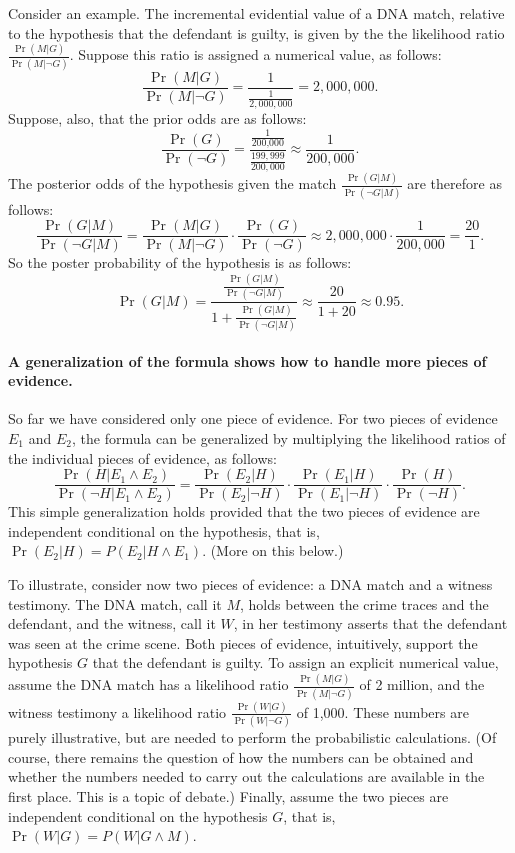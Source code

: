 \documentclass[10pt]{article}
\begin{document}
Consider an example. The incremental evidential value of a DNA match, relative to the hypothesis 
that the defendant is guilty, is given by the the likelihood ratio $\frac{\Pr(M |G)}{\Pr( M | \neg G)}$. 
Suppose this ratio is assigned a numerical value, as follows:
%
\[\frac{\Pr(M |G)}{\Pr( M | \neg G)}=\frac{1}{\frac{1}{2,000,000}}=2, 000,000.\]
% 
Suppose, also, that the prior odds are as follows:
%
\[\frac{\Pr(G)}{\Pr(\neg G)}=\frac{\frac{1}{\text{200,000}}}{\frac{199,999}{200,000}}\approx \frac{1}{200,000}.\]
% 
The posterior odds of the hypothesis given the match $\frac{\Pr(G|M)}{\Pr(\neg G|M)}$ are therefore as follows:
%
\[\frac{\Pr(G|M)}{\Pr(\neg G|M)}= \frac{\Pr(M |G)}{\Pr( M | \neg G)}\cdot \frac{\Pr(G)}{\Pr(\neg G)} \approx 2,000,000 \cdot \frac{1}{200,000}=\frac{20}{1}.\]
% 
So the poster probability of the hypothesis is as follows:
%
\[\Pr(G|M)= \frac{\frac{\Pr(G|M)}{\Pr(\neg G|M)}}{1+ \frac{\Pr(G|M)}{\Pr(\neg G|M)}} \approx \frac{20}{1+20}\approx 0.95.\]
%
 


\paragraph{A generalization of the formula shows how to handle more pieces of evidence.} 
So far we have considered only one piece of evidence. 
For two pieces of evidence $E_1$ and $E_2$, the formula can be generalized 
by multiplying the likelihood ratios of the individual pieces of evidence, as follows:
	\[ \frac{\Pr(H|E_1 \land E_2)}{\Pr(\neg H | E_1 \land E_2)} = 
	\frac{\Pr(E_2 | H)}{\Pr(E_2| \neg H)}
	\cdot 
	\frac{\Pr(E_1 | H)}{\Pr(E_1| \neg H)}
	\cdot 
	\frac{\Pr(H)}{\Pr(\neg H)}.\]
This simple generalization holds provided that the two pieces of evidence are 
independent conditional on the hypothesis, that is, $\Pr(E_2| H)=P(E_2| H \wedge E_1)$. 
(More on this below.) 

To illustrate, consider now two pieces of evidence: a DNA match and a witness testimony.
The DNA match, call it $M$, holds between the crime traces and the defendant, and 
the witness, call it $W$, in her testimony asserts that the defendant was 
seen at the crime scene. 
Both pieces of evidence, intuitively, support the hypothesis $G$ that the defendant 
is guilty. To assign an explicit numerical value, assume
 the DNA match has a likelihood ratio $\frac{\Pr(M | G)}{\Pr( M | \neg G)}$ of 2 million, 
and the witness testimony a likelihood ratio $\frac{\Pr(W | G)}{\Pr( W | \neg G)}$ of 1,000. 
These numbers are purely illustrative, but are needed to perform the probabilistic calculations. (Of course, there remains the 
question of how the numbers can be obtained and whether the numbers 
needed to carry out the calculations are available in the first place. This is a topic of debate.) Finally, assume the two pieces are independent conditional on the hypothesis $G$, that is, 
$\Pr(W|G)=P(W| G\wedge M)$. 
\end{document}
